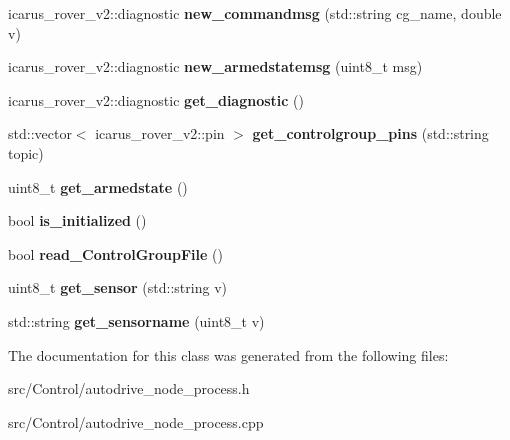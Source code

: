 \begin{DoxyCompactItemize}
icarus\+\_\+rover\+\_\+v2\+::diagnostic {\bfseries new\+\_\+commandmsg} (std\+::string cg\+\_\+name, double v)
\item 
\mbox{\label{classAutoDriveNodeProcess_af8965acf43c8a40c2b9b6e3a23549f89}} 
icarus\+\_\+rover\+\_\+v2\+::diagnostic {\bfseries new\+\_\+armedstatemsg} (uint8\+\_\+t msg)
\item 
\mbox{\label{classAutoDriveNodeProcess_a00d152dec2e61f02d337c9227d8531c3}} 
icarus\+\_\+rover\+\_\+v2\+::diagnostic {\bfseries get\+\_\+diagnostic} ()
\item 
\mbox{\label{classAutoDriveNodeProcess_afe7f443227cc29c6ad684fd21e0b1063}} 
std\+::vector$<$ icarus\+\_\+rover\+\_\+v2\+::pin $>$ {\bfseries get\+\_\+controlgroup\+\_\+pins} (std\+::string topic)
\item 
\mbox{\label{classAutoDriveNodeProcess_a0ad7e2c7c1b0537a9a9309150e5b8849}} 
uint8\+\_\+t {\bfseries get\+\_\+armedstate} ()
\item 
\mbox{\label{classAutoDriveNodeProcess_a54ea6915b6d581691d63f1ef793c1d91}} 
bool {\bfseries is\+\_\+initialized} ()
\item 
\mbox{\label{classAutoDriveNodeProcess_a9675cf2326229691091886587cc3c4c6}} 
bool {\bfseries read\+\_\+\+Control\+Group\+File} ()
\item 
\mbox{\label{classAutoDriveNodeProcess_a3f5eeeb4736943af4f80911ad17abc83}} 
uint8\+\_\+t {\bfseries get\+\_\+sensor} (std\+::string v)
\item 
\mbox{\label{classAutoDriveNodeProcess_a239d821c656241c4c92f850121a260a9}} 
std\+::string {\bfseries get\+\_\+sensorname} (uint8\+\_\+t v)
\end{DoxyCompactItemize}


The documentation for this class was generated from the following files\+:\begin{DoxyCompactItemize}
\item 
src/\+Control/autodrive\+\_\+node\+\_\+process.\+h\item 
src/\+Control/autodrive\+\_\+node\+\_\+process.\+cpp\end{DoxyCompactItemize}
